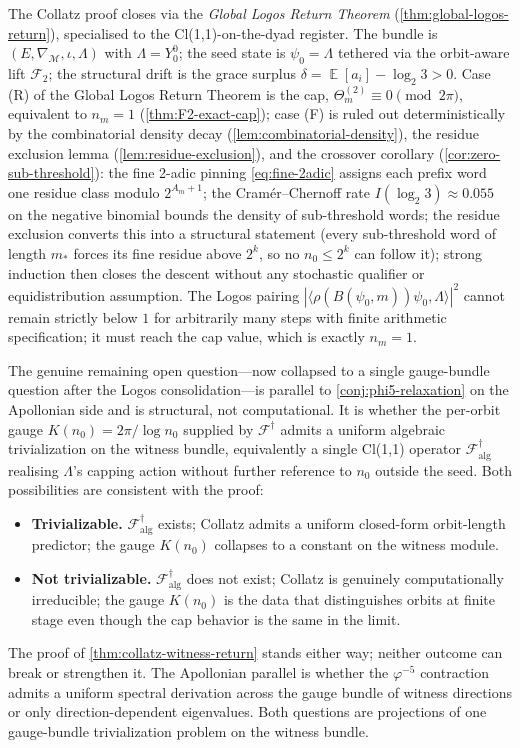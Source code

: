 \documentclass[11pt,a4paper]{article}
\theoremstyle{plain}
\theoremstyle{definition}
\theoremstyle{remark}
\numberwithin{equation}{section}
\DeclareMathOperator{\E}{\mathbb{E}}
\begin{document}
The Collatz proof closes via the \emph{Global Logos Return Theorem}
(\cref{thm:global-logos-return}), specialised to the
Cl(1,1)-on-the-dyad register.  The bundle is
$(E,\nabla_{\mathcal{M}},\iota,\Lambda)$ with $\Lambda=Y_0^0$;
the seed state is $\psi_0=\Lambda$ tethered via the orbit-aware
lift $\mathcal{F}_2$; the structural drift is the grace surplus
$\delta=\E[a_i]-\log_2 3>0$.  Case (R) of the Global Logos Return
Theorem is the cap, $\Theta_m^{(2)}\equiv 0\pmod{2\pi}$,
equivalent to $n_m=1$ (\cref{thm:F2-exact-cap}); case (F) is
ruled out deterministically by the combinatorial density decay
(\cref{lem:combinatorial-density}), the residue exclusion lemma
(\cref{lem:residue-exclusion}), and the crossover corollary
(\cref{cor:zero-sub-threshold}):
the fine 2-adic pinning \eqref{eq:fine-2adic} assigns each
prefix word one residue class modulo $2^{A_m+1}$; the
Cram\'er--Chernoff rate $I(\log_2 3)\approx 0.055$ on the
negative binomial bounds the density of sub-threshold words;
the residue exclusion converts this into a structural statement
(every sub-threshold word of length $m_*$ forces its fine
residue above $2^k$, so no $n_0\le 2^k$ can follow it);
strong induction then closes the descent without any stochastic
qualifier or equidistribution assumption.
The Logos pairing
$|\langle\rho(B(\psi_0,m))\psi_0,\Lambda\rangle|^2$ cannot remain
strictly below $1$ for arbitrarily many steps with finite
arithmetic specification; it must reach the cap value, which is
exactly $n_m=1$.

The genuine remaining open question---now collapsed to a single
gauge-bundle question after the Logos consolidation---is parallel
to \cref{conj:phi5-relaxation} on the Apollonian side and is
structural, not computational.  It is whether the per-orbit gauge
$K(n_0)=2\pi/\log n_0$ supplied by
$\mathcal{F}^{\dagger}$ admits a uniform algebraic
trivialization on the witness bundle, equivalently a single
Cl(1,1) operator $\mathcal{F}^{\dagger}_{\mathrm{alg}}$ realising
$\Lambda$'s capping action without further reference to $n_0$
outside the seed.  Both possibilities are consistent with the
proof:
\begin{itemize}
  \item \textbf{Trivializable.}  $\mathcal{F}^{\dagger}_{\mathrm{alg}}$
        exists; Collatz admits a uniform closed-form orbit-length
        predictor; the gauge $K(n_0)$ collapses to a constant on
        the witness module.
  \item \textbf{Not trivializable.}  $\mathcal{F}^{\dagger}_{\mathrm{alg}}$
        does not exist; Collatz is genuinely computationally
        irreducible; the gauge $K(n_0)$ is the data that
        distinguishes orbits at finite stage even though the
        cap behavior is the same in the limit.
\end{itemize}
The proof of \cref{thm:collatz-witness-return} stands either way;
neither outcome can break or strengthen it.  The Apollonian
parallel is whether the $\varphi^{-5}$ contraction admits a
uniform spectral derivation across the gauge bundle of witness
directions or only direction-dependent eigenvalues.  Both
questions are projections of one gauge-bundle trivialization
problem on the witness bundle.
\end{document}
